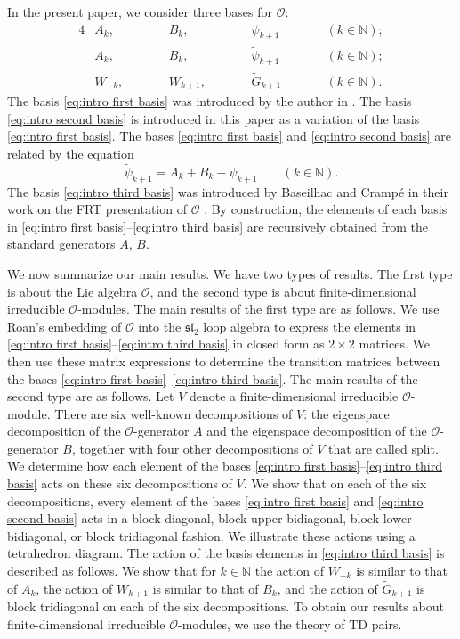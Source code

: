 \documentclass[11pt]{article}%
\theoremstyle{definition}
\theoremstyle{plain}
\begin{document}
\smallskip
In the present paper, we consider three bases for $\mathcal{O}$:
\begin{alignat}{4}
	& A_k,     \qquad && B_k,     \qquad && \psi_{k+1} \qquad && (k \in \mathbb{N}); \label{eq:intro first basis}\\
	& A_k,     \qquad && B_k,     \qquad && \tilde\psi_{k+1} \qquad && (k \in \mathbb{N}); \label{eq:intro second basis}\\
	& W_{-k},  \qquad && W_{k+1}, \qquad && \tilde G_{k+1} \qquad && (k \in \mathbb{N}). \label{eq:intro third basis}
\end{alignat}
The basis \eqref{eq:intro first basis} was introduced by the author in  \cite{2026LeeJOAC}.
The basis \eqref{eq:intro second basis} is introduced in this paper as a variation of the basis \eqref{eq:intro first basis}.
The bases \eqref{eq:intro first basis} and \eqref{eq:intro second basis} are related by the equation
\begin{equation*}
	\tilde\psi_{k+1}=A_k+B_k-\psi_{k+1} \qquad (k\in\mathbb{N}).
\end{equation*}
The basis \eqref{eq:intro third basis} was introduced by Baseilhac and Cramp\'e in their work on the FRT presentation of $\mathcal{O}$ \cite{2019BC}.
By construction, the elements of each basis in \eqref{eq:intro first basis}--\eqref{eq:intro third basis} are recursively obtained from the standard generators $A$, $B$.


\smallskip
We now summarize our main results.
We have two types of results.
The first type is about the Lie algebra $\mathcal{O}$, and the second type is about finite-dimensional irreducible $\mathcal{O}$-modules.
The main results of the first type are as follows.
We use Roan's embedding of $\mathcal{O}$ into the $\mathfrak{sl}_2$ loop algebra to express the elements in \eqref{eq:intro first basis}--\eqref{eq:intro third basis} in closed form as $2\times 2$ matrices.
We then use these matrix expressions to determine the transition matrices between the bases \eqref{eq:intro first basis}--\eqref{eq:intro third basis}.
The main results of the second type are as follows.
Let $V$ denote a finite-dimensional irreducible $\mathcal{O}$-module.
There are six well-known decompositions of $V$: the eigenspace decomposition of the $\mathcal{O}$-generator $A$ and the eigenspace decomposition of the $\mathcal{O}$-generator $B$, together with four other decompositions of $V$ that are called split.
We determine how each element of the bases \eqref{eq:intro first basis}--\eqref{eq:intro third basis} acts on these six decompositions of $V$.
We show that on each of the six decompositions, every element of the bases \eqref{eq:intro first basis} and \eqref{eq:intro second basis} acts in a block diagonal, block upper bidiagonal, block lower bidiagonal, or block tridiagonal fashion.
We illustrate these actions using a tetrahedron diagram.
The action of the basis elements in \eqref{eq:intro third basis} is described as follows.
We show that for $k \in \mathbb{N}$ the action of $W_{-k}$ is similar to that of $A_k$, the action of $W_{k+1}$ is similar to that of $B_k$, and the action of $\tilde G_{k+1}$ is block tridiagonal on each of the six decompositions.
To obtain our results about finite-dimensional irreducible $\mathcal{O}$-modules, we use the theory of TD pairs.
\end{document}
